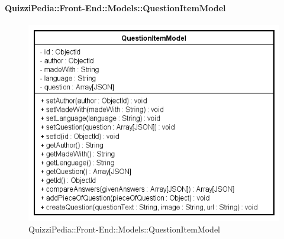 \paragraph{QuizziPedia::Front-End::Models::QuestionItemModel}
		
		\label{QuizziPedia::Front-End::Models::QuestionItemModel}
		
		\begin{figure}[ht]
			\centering
			\includegraphics[scale=0.80,keepaspectratio]{UML/Classi/Front-End/QuizziPedia_Front-end_Models_QuestionItemModel.png}
			\caption{QuizziPedia::Front-End::Models::QuestionItemModel}
		\end{figure} \FloatBarrier
		
